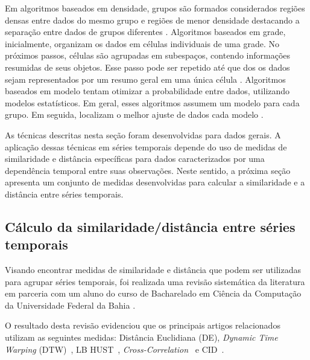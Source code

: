 Em algoritmos baseados em densidade, grupos são formados considerados regiões densas entre dados do mesmo grupo e regiões de menor densidade destacando a separação entre dados de grupos diferentes \cite{Nguyen2015}. Algoritmos baseados em grade, inicialmente, organizam os dados em células individuais de uma grade. No próximos passos, células são agrupadas em subespaços, contendo informações resumidas de seus objetos. Esse passo pode ser repetido até que dos os dados sejam representados por um resumo geral em uma única célula \cite{Nguyen2015}. Algoritmos baseados em modelo tentam otimizar a probabilidade entre dados, utilizando modelos estatísticos. Em geral, esses algoritmos assumem um modelo para cada grupo. Em seguida, localizam o melhor ajuste de dados cada modelo \cite{Nguyen2015,Aghabozorgi2015}. %

As técnicas descritas nesta seção foram desenvolvidas para dados gerais. A aplicação dessas técnicas em séries temporais depende do uso de medidas de similaridade e distância específicas para dados caracterizados por uma dependência temporal entre suas observações. Neste sentido, a próxima seção apresenta um conjunto de medidas desenvolvidas para calcular a similaridade e a distância entre séries temporais.

\subsection{Cálculo da similaridade/distância entre séries temporais} 

 
Visando encontrar medidas de similaridade e distância que podem ser utilizadas para agrupar séries temporais, foi realizada uma revisão sistemática da literatura em parceria com um aluno do curso de Bacharelado em Ciência da Computação da Universidade Federal da Bahia \cite{tcc2016}. 

O resultado desta revisão evidenciou que os principais artigos relacionados utilizam as seguintes medidas: Distância Euclidiana (DE), \emph{Dynamic Time Warping} (DTW)~\cite{zhang2011}, LB HUST~\cite{Lbhust}, \textit{Cross-Correlation}~\cite{cross} e \ac{CID}~\cite{Batista2014}.

